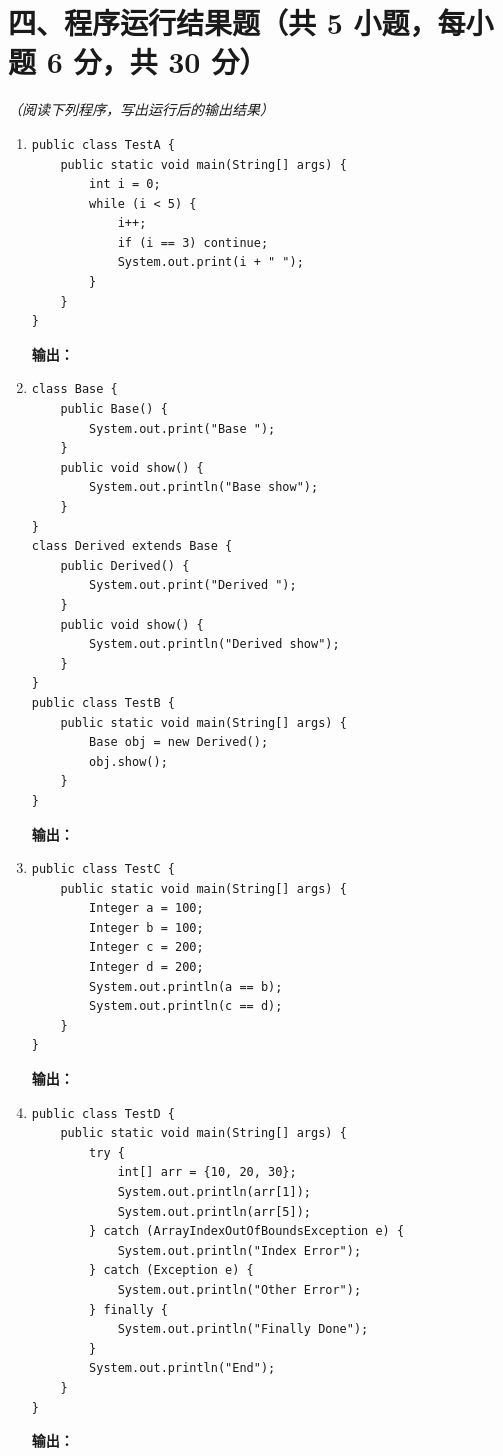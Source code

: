 \documentclass[a3paper, landscape, 11pt, twocolumn]{article}
\begin{document}
\section*{四、程序运行结果题（共 5 小题，每小题 6 分，共 30 分）}
\textit{（阅读下列程序，写出运行后的输出结果）}

\begin{enumerate}[label=\arabic*., itemsep=1em]
	\item
	      \begin{lstlisting}[style=JavaExam]
public class TestA {
    public static void main(String[] args) {
        int i = 0;
        while (i < 5) {
            i++;
            if (i == 3) continue;
            System.out.print(i + " ");
        }
    }
}
\end{lstlisting}
	      \textbf{输出：}\underline{\hspace{5cm}}

	\item
	      \begin{lstlisting}[style=JavaExam]
class Base {
    public Base() {
        System.out.print("Base ");
    }
    public void show() {
        System.out.println("Base show");
    }
}
class Derived extends Base {
    public Derived() {
        System.out.print("Derived ");
    }
    public void show() {
        System.out.println("Derived show");
    }
}
public class TestB {
    public static void main(String[] args) {
        Base obj = new Derived();
        obj.show();
    }
}
\end{lstlisting}
	      \textbf{输出：}\underline{\hspace{5cm}}

	\item
	      \begin{lstlisting}[style=JavaExam]
public class TestC {
    public static void main(String[] args) {
        Integer a = 100;
        Integer b = 100;
        Integer c = 200;
        Integer d = 200;
        System.out.println(a == b);
        System.out.println(c == d);
    }
}
\end{lstlisting}
	      \textbf{输出：}\underline{\hspace{5cm}}

	\item
	      \begin{lstlisting}[style=JavaExam]
public class TestD {
    public static void main(String[] args) {
        try {
            int[] arr = {10, 20, 30};
            System.out.println(arr[1]);
            System.out.println(arr[5]);
        } catch (ArrayIndexOutOfBoundsException e) {
            System.out.println("Index Error");
        } catch (Exception e) {
            System.out.println("Other Error");
        } finally {
            System.out.println("Finally Done");
        }
        System.out.println("End");
    }
}
\end{lstlisting}
	      \textbf{输出：}\underline{\hspace{5cm}}


\end{enumerate}
\end{document}
